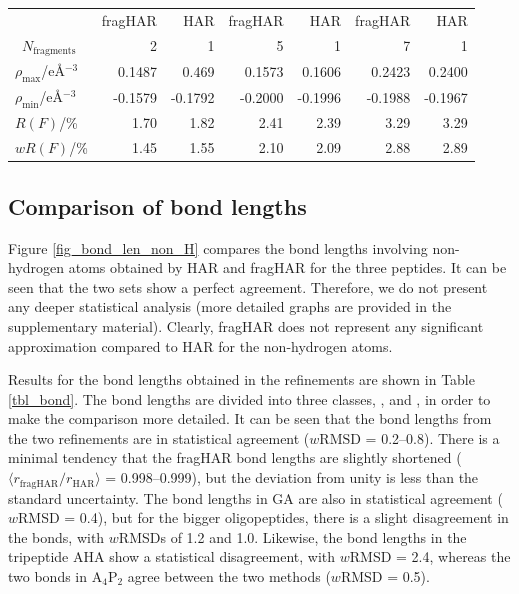 \documentclass[preprint,dvipsnames]{iucr}              %
\newcommand{\s}[1]{{\textrm{#1}}}
\begin{document}
\begin{table}
\begin{tabular*}{\linewidth}{lrrrrrr}
                            &fragHAR    &HAR     &fragHAR        &HAR     &fragHAR    &HAR \\
\
   $N_\s{fragments}$ &2&1&5&1&7&1\\
   $\rho_\s{max}$/e\AA$^{-3}$ &0.1487   &0.469      &0.1573     &0.1606     &0.2423     &0.2400   \\
   $\rho_\s{min}$/e\AA$^{-3}$ &-0.1579  &-0.1792    &-0.2000    &-0.1996    &-0.1988    &-0.1967  \\
   $R(F)$/\%                 &1.70      &1.82       &2.41       &2.39       &3.29       &3.29       \\
   $wR(F)$/\%                &1.45      &1.55       &2.10       &2.09       &2.88       &2.89       \\
 \hline
  \end{tabular*}
\end{table}






\subsection{Comparison of bond lengths}

Figure \ref{fig_bond_len_non_H} compares the bond lengths involving non-hydrogen atoms obtained by HAR and fragHAR for the three peptides. It can be seen that the two sets show a perfect agreement. Therefore, we do not present any deeper
statistical analysis (more detailed graphs are provided in the supplementary material). 
Clearly, fragHAR does not represent any significant approximation compared 
to HAR for the non-hydrogen atoms.

Results for the  bond lengths obtained in the refinements are shown in Table \ref{tbl_bond}. The bond lengths
are divided into three classes, , \ce{N-H} and 
, in order to make the comparison more detailed.
It can be seen that the \ce{C-H} bond lengths from the two refinements are in statistical agreement ($w\s{RMSD}$ = 0.2--0.8). 
There is a minimal tendency that the fragHAR bond lengths are slightly  shortened ($\langle  r_\s{fragHAR}/r_\s{HAR}\rangle$ = 0.998--0.999), but the deviation from unity is less than the standard uncertainty. 
The \ce{N-H} bond lengths in GA are also in statistical agreement ($w$RMSD = 0.4),
but for the bigger oligopeptides, there is a slight
disagreement in the  bonds, with $w$RMSDs of 1.2 and 1.0. Likewise, the
 bond lengths in the tripeptide AHA show a statistical disagreement,
with $w$RMSD = 2.4, whereas the two \ce{O-H} bonds in A$_4$P$_2$ agree between the two methods ($w$RMSD = 0.5).
\end{document}
